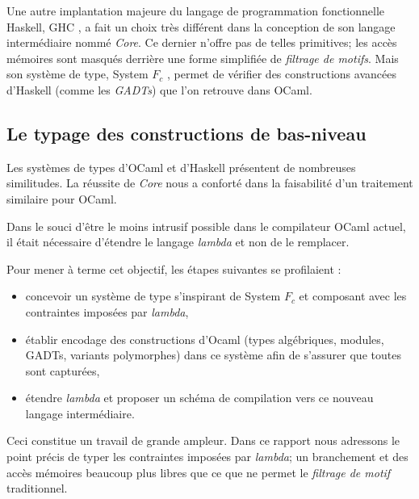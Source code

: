 Une autre implantation majeure du langage de programmation fonctionnelle
Haskell, GHC \cite{Marlow98thenew}, a fait un choix très différent dans la
conception de son langage intermédiaire nommé \emph{Core}.  Ce dernier n'offre
pas de telles primitives; les accès mémoires sont masqués derrière une forme
simplifiée de \emph{filtrage de motifs}. Mais son système de type, System $F_c$
\cite{Sulzmann07systemf}, permet de vérifier des constructions avancées
d'Haskell (comme les \emph{GADTs}) que l'on retrouve dans OCaml.

\subsection{Le typage des constructions de bas-niveau}

Les systèmes de types d'OCaml et d'Haskell présentent de nombreuses
similitudes. La réussite de \emph{Core} nous a conforté dans la faisabilité
d'un traitement similaire pour OCaml.

Dans le souci d'être le moins intrusif possible dans le compilateur
OCaml actuel, il était nécessaire d'étendre le langage \emph{lambda} et non de
le remplacer.

Pour mener à terme cet objectif, les étapes suivantes se profilaient :
\begin{itemize}
  \item concevoir un système de type s'inspirant de System $F_c$ et composant
    avec les contraintes imposées par \emph{lambda},
  \item établir encodage des constructions d'Ocaml (types algébriques, modules,
    GADTs, variants polymorphes) dans ce système afin de s'assurer que toutes
    sont capturées,
  \item étendre \emph{lambda} et proposer un schéma de compilation vers ce
    nouveau langage intermédiaire.
\end{itemize}

Ceci constitue un travail de grande ampleur. Dans ce rapport nous adressons le
point précis de typer les contraintes imposées par \emph{lambda}; un
branchement et des accès mémoires beaucoup plus libres que ce que ne permet le
\emph{filtrage de motif} traditionnel.

